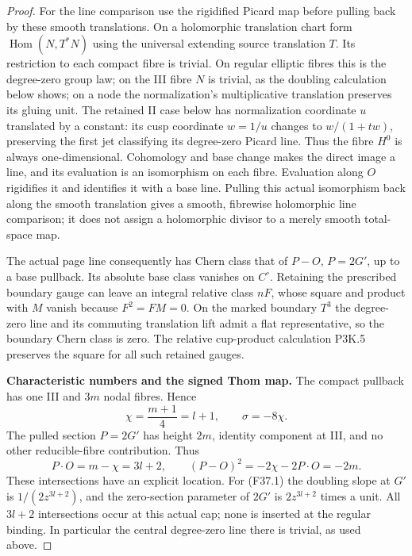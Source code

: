 \begin{proof}
For the line comparison use the rigidified Picard map before
pulling back by these smooth translations. On a holomorphic
translation chart form $\operatorname{Hom}(N,T^*N)$ using
the universal extending source translation $T$. Its restriction
to each compact fibre is trivial. On regular elliptic fibres
this is the degree-zero group law; on the III fibre $N$ is
trivial, as the doubling calculation below shows; on a node
the normalization's multiplicative translation preserves its
gluing unit. The retained II case below has normalization
coordinate $u$ translated by a constant: its cusp coordinate
$w=1/u$ changes to $w/(1+tw)$, preserving the first jet
classifying its degree-zero Picard line. Thus the fibre $H^0$
is always one-dimensional. Cohomology and base change makes
the direct image a line, and its evaluation is an isomorphism
on each fibre. Evaluation along $O$ rigidifies it and identifies
it with a base line. Pulling this actual isomorphism back along
the smooth translation gives a smooth, fibrewise holomorphic
line comparison; it does not assign a holomorphic divisor to
a merely smooth total-space map.

The actual page line consequently has Chern class that of
$P-O$, $P=2G'$, up to a base pullback. Its absolute base class
vanishes on $C^\circ$. Retaining the prescribed boundary
gauge can leave an integral relative class $nF$, whose square
and product with $M$ vanish because $F^2=FM=0$. On the marked
boundary $T^3$ the degree-zero line and its commuting
translation lift admit a flat representative, so the boundary
Chern class is zero. The relative cup-product calculation
P3K.5 preserves the square for all such retained gauges.

\par\medskip\noindent\textbf{Characteristic numbers and the signed Thom map.}
The compact pullback has one III and $3m$ nodal fibres.
Hence
\[
 \chi=\frac{m+1}{4}=l+1,\qquad \sigma=-8\chi.
\]
The pulled section $P=2G'$ has height $2m$, identity component
at III, and no other reducible-fibre contribution. Thus
\[
 P\cdot O=m-\chi=3l+2,\qquad
 (P-O)^2=-2\chi-2P\cdot O=-2m.                         \tag{K24.9}
\]
These intersections have an explicit location. For (F37.1)
the doubling slope at $G'$ is $1/(2z^{3l+2})$, and the
zero-section parameter of $2G'$ is $2z^{3l+2}$ times a unit.
All $3l+2$ intersections occur at this actual cap; none is
inserted at the regular binding. In particular the central
degree-zero line there is trivial, as used above.


\end{proof}
